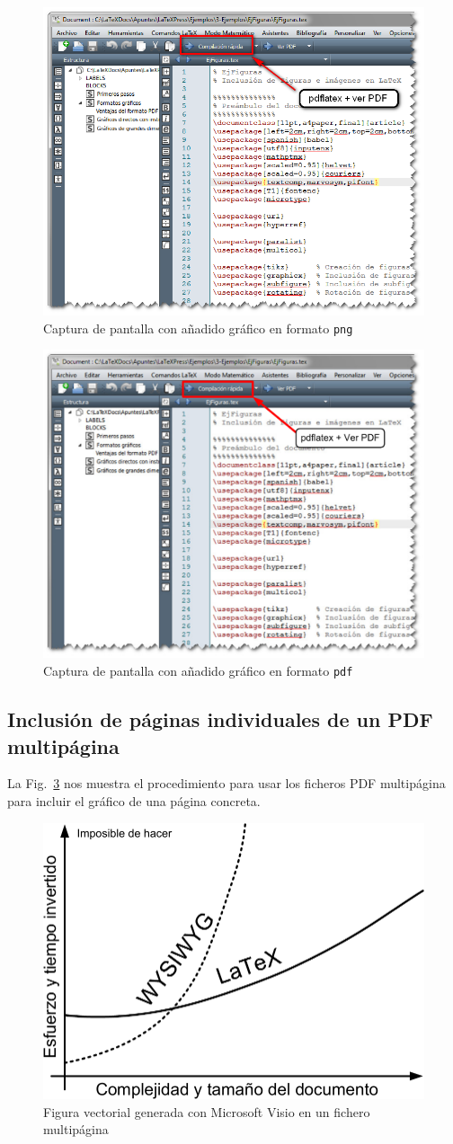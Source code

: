 \documentclass[11pt,a4paper]{article}
\begin{document}
\begin{figure}[hbt]
	\centering
	\includegraphics[width=0.5\linewidth]{texmk02} 
	\caption[Captura con gráfico en \texttt{png}]{Captura de pantalla con añadido gráfico en formato \texttt{png}}
	\label{fig:texmk02}
\end{figure}

\begin{figure}[hbt]
	\centering
	\includegraphics[width=0.5\linewidth]{texmk03} 
	\caption[Captura con gráfico en \texttt{pdf}]{Captura de pantalla con añadido gráfico en formato \texttt{pdf}}
	\label{fig:texmk03}
\end{figure}




\newpage
\subsection{Inclusión de páginas individuales de un PDF multipágina}

La Fig.~\ref{fig:visio_mp} nos muestra el procedimiento para usar los ficheros PDF multipágina para incluir el gráfico de una página concreta.

\begin{figure}[hbt]
	\centering
	\includegraphics[page=2,width=0.5\linewidth]{visio_mp} 
	\caption[Gráfico de Visio multipágina]{Figura vectorial generada con Microsoft Visio en un fichero multipágina}
	\label{fig:visio_mp}
\end{figure}
\end{document}
